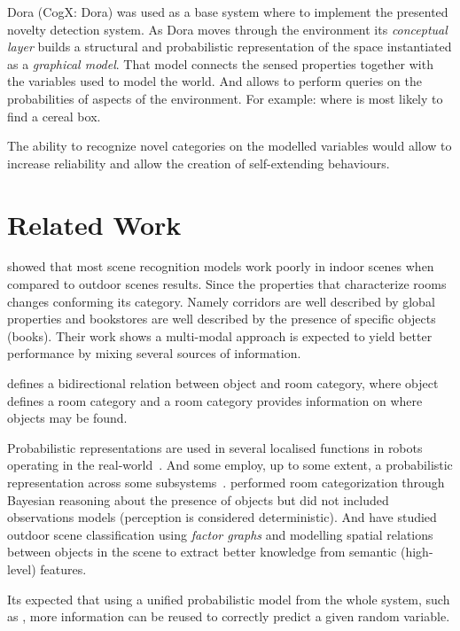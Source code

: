\documentclass[runningheads,a4paper]{llncs}
\begin{document}
Dora\cite{dora} (CogX: Dora) was used as a base system where to implement the presented novelty
detection system.
As Dora moves through the environment its \emph{conceptual layer} builds a structural and
probabilistic representation of the space instantiated as a \emph{graphical model}.
That model connects the sensed properties together with the variables used to model the world.
And allows to perform queries on the probabilities of aspects of the environment.
For example: where is most likely to find a cereal box\cite{exploiting}.

The ability to recognize novel categories on the modelled variables would allow to increase
reliability and allow the creation of self-extending behaviours.


\section{Related Work}
\cite{quattoni2009recognizing} showed that most scene recognition models work poorly in indoor
scenes when compared to outdoor scenes results.
Since the properties that characterize rooms changes conforming its category. Namely corridors are
well described by global properties and bookstores are well described by the presence of specific objects (books).
Their work shows a multi-modal approach is expected to yield better performance by mixing several sources of information.

\cite{galindo2005multi} defines a bidirectional relation between object and room category, where object defines a room category and a room category provides information on where objects may be found.

Probabilistic representations are used in several localised functions in robots operating in the real-world~\cite{gross2009toomas,maierprobabilistic}. And some employ, up to some extent, a probabilistic representation across some subsystems~\cite{kraft2008exploration}.
\cite{vasudevan2008bayesian} performed room categorization through Bayesian reasoning about the presence of objects but did not included observations models (perception is considered deterministic).
And \cite{boutell2006factor} have studied outdoor scene classification using \emph{factor graphs} and modelling spatial relations between objects in the scene to extract better knowledge from semantic (high-level) features.

Its expected that using a unified probabilistic model from the whole system, such as \cite{pronobis2011exploiting}, more information can be reused to correctly predict a given random variable.
\end{document}
